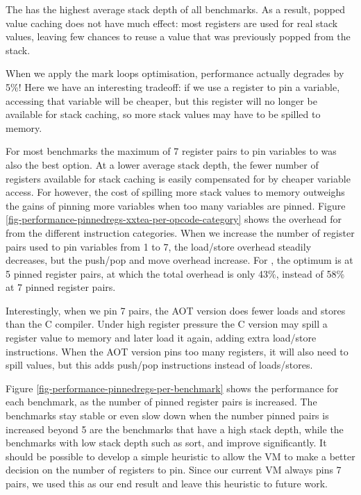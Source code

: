 The  has the highest average stack depth of all benchmarks. As a result, popped value caching does not have much effect: most registers are used for real stack values, leaving few chances to reuse a value that was previously popped from the stack. 

When we apply the mark loops optimisation, performance actually degrades by 5\%! Here we have an interesting tradeoff: if we use a register to pin a variable, accessing that variable will be cheaper, but this register will no longer be available for stack caching, so more stack values may have to be spilled to memory.

For most benchmarks the maximum of 7 register pairs to pin variables to was also the best option. At a lower average stack depth, the fewer number of registers available for stack caching is easily compensated for by cheaper variable access. For  however, the cost of spilling more stack values to memory outweighs the gains of pinning more variables when too many variables are pinned. Figure \ref{fig-performance-pinnedregs-xxtea-per-opcode-category} shows the overhead for  from the different instruction categories. When we increase the number of register pairs used to pin variables from 1 to 7, the load/store overhead steadily decreases, but the push/pop and move overhead increase. For , the optimum is at 5 pinned register pairs, at which the total overhead is only 43\%, instead of 58\% at 7 pinned register pairs.

Interestingly, when we pin 7 pairs, the AOT version does fewer loads and stores than the C compiler. Under high register pressure the C version may spill a register value to memory and later load it again, adding extra load/store instructions. When the AOT version pins too many registers, it will also need to spill values, but this adds push/pop instructions instead of loads/stores.

Figure \ref{fig-performance-pinnedregs-per-benchmark} shows the performance for each benchmark, as the number of pinned register pairs is increased. The benchmarks stay stable or even slow down when the number pinned pairs is increased beyond 5 are the benchmarks that have a high stack depth, while the benchmarks with low stack depth such as sort,  and  improve significantly. It should be possible to develop a simple heuristic to allow the VM to make a better decision on the number of registers to pin. Since our current VM always pins 7 pairs, we used this as our end result and leave this heuristic to future work.

